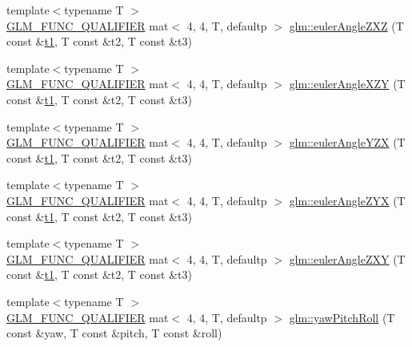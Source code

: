 \begin{DoxyCompactItemize}
\item 
{\footnotesize template$<$typename T $>$ }\\\hyperlink{setup_8hpp_a33fdea6f91c5f834105f7415e2a64407}{G\+L\+M\+\_\+\+F\+U\+N\+C\+\_\+\+Q\+U\+A\+L\+I\+F\+I\+ER} mat$<$ 4, 4, T, defaultp $>$ \hyperlink{group__gtx__euler__angles_ga178f966c52b01e4d65e31ebd007e3247}{glm\+::euler\+Angle\+Z\+XZ} (T const \&\hyperlink{_s_d_l__opengl__glext_8h_af48031a37b713afa3b0d0d7d29653d7c}{t1}, T const \&t2, T const \&t3)
\item 
{\footnotesize template$<$typename T $>$ }\\\hyperlink{setup_8hpp_a33fdea6f91c5f834105f7415e2a64407}{G\+L\+M\+\_\+\+F\+U\+N\+C\+\_\+\+Q\+U\+A\+L\+I\+F\+I\+ER} mat$<$ 4, 4, T, defaultp $>$ \hyperlink{group__gtx__euler__angles_ga996dce12a60d8a674ba6737a535fa910}{glm\+::euler\+Angle\+X\+ZY} (T const \&\hyperlink{_s_d_l__opengl__glext_8h_af48031a37b713afa3b0d0d7d29653d7c}{t1}, T const \&t2, T const \&t3)
\item 
{\footnotesize template$<$typename T $>$ }\\\hyperlink{setup_8hpp_a33fdea6f91c5f834105f7415e2a64407}{G\+L\+M\+\_\+\+F\+U\+N\+C\+\_\+\+Q\+U\+A\+L\+I\+F\+I\+ER} mat$<$ 4, 4, T, defaultp $>$ \hyperlink{group__gtx__euler__angles_ga08bef16357b8f9b3051b3dcaec4b7848}{glm\+::euler\+Angle\+Y\+ZX} (T const \&\hyperlink{_s_d_l__opengl__glext_8h_af48031a37b713afa3b0d0d7d29653d7c}{t1}, T const \&t2, T const \&t3)
\item 
{\footnotesize template$<$typename T $>$ }\\\hyperlink{setup_8hpp_a33fdea6f91c5f834105f7415e2a64407}{G\+L\+M\+\_\+\+F\+U\+N\+C\+\_\+\+Q\+U\+A\+L\+I\+F\+I\+ER} mat$<$ 4, 4, T, defaultp $>$ \hyperlink{group__gtx__euler__angles_ga2e61f1e39069c47530acab9167852dd6}{glm\+::euler\+Angle\+Z\+YX} (T const \&\hyperlink{_s_d_l__opengl__glext_8h_af48031a37b713afa3b0d0d7d29653d7c}{t1}, T const \&t2, T const \&t3)
\item 
{\footnotesize template$<$typename T $>$ }\\\hyperlink{setup_8hpp_a33fdea6f91c5f834105f7415e2a64407}{G\+L\+M\+\_\+\+F\+U\+N\+C\+\_\+\+Q\+U\+A\+L\+I\+F\+I\+ER} mat$<$ 4, 4, T, defaultp $>$ \hyperlink{group__gtx__euler__angles_gab4505c54d2dd654df4569fd1f04c43aa}{glm\+::euler\+Angle\+Z\+XY} (T const \&\hyperlink{_s_d_l__opengl__glext_8h_af48031a37b713afa3b0d0d7d29653d7c}{t1}, T const \&t2, T const \&t3)
\item 
{\footnotesize template$<$typename T $>$ }\\\hyperlink{setup_8hpp_a33fdea6f91c5f834105f7415e2a64407}{G\+L\+M\+\_\+\+F\+U\+N\+C\+\_\+\+Q\+U\+A\+L\+I\+F\+I\+ER} mat$<$ 4, 4, T, defaultp $>$ \hyperlink{group__gtx__euler__angles_gae6aa26ccb020d281b449619e419a609e}{glm\+::yaw\+Pitch\+Roll} (T const \&yaw, T const \&pitch, T const \&roll)

\end{DoxyCompactItemize}
